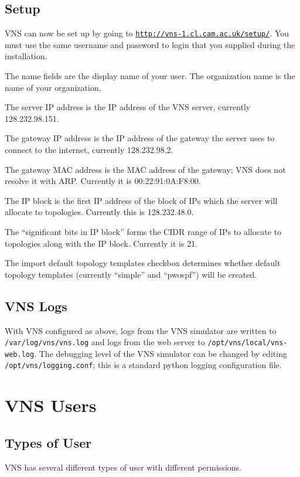 \documentclass[a4paper,12pt]{report}
\begin{document}
\section{Setup}
VNS can now be set up by going to \texttt{\url{http://vns-1.cl.cam.ac.uk/setup/}}.  You must use the same username and password to login that you supplied during the installation.

The name fields are the display name of your user.  The organization name is the name of your organization.

The server IP address is the IP address of the VNS server, currently 128.232.98.151.

The gateway IP address is the IP address of the gateway the server uses to connect to the internet, currently 128.232.98.2.

The gateway MAC address is the MAC address of the gateway; VNS does not resolve it with ARP.  Currently it is 00:22:91:0A:F8:00.

The IP block is the first IP address of the block of IPs which the server will allocate to topologies.  Currently this is 128.232.48.0.

The ``significant bits in IP block'' forms the CIDR range of IPs to allocate to topologies along with the IP block.  Currently it is 21.

The import default topology templates checkbox determines whether default topology templates (currently ``simple'' and ``pwospf'') will be created.

\section{VNS Logs}
With VNS configured as above, logs from the VNS simulator are written to \texttt{/var/log/vns/vns.log} and logs from the web server to \texttt{/opt/vns/local/vns-web.log}.  The debugging level of the VNS simulator can be changed by editing \texttt{/opt/vns/logging.conf}; this is a standard python logging configuration file.


\chapter{VNS Users}

\section{Types of User}
VNS has several different types of user with different permissions.
\end{document}
